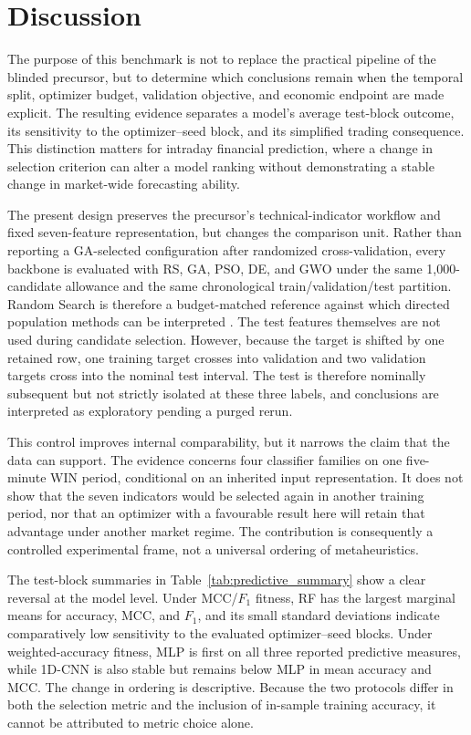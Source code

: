 \section{Discussion}\label{sec:discussion}

The purpose of this benchmark is not to replace the practical pipeline of the blinded precursor, but to determine which conclusions remain when the temporal split, optimizer budget, validation objective, and economic endpoint are made explicit. The resulting evidence separates a model's average test-block outcome, its sensitivity to the optimizer--seed block, and its simplified trading consequence. This distinction matters for intraday financial prediction, where a change in selection criterion can alter a model ranking without demonstrating a stable change in market-wide forecasting ability.

The present design preserves the precursor's technical-indicator workflow and fixed seven-feature representation, but changes the comparison unit. Rather than reporting a GA-selected configuration after randomized cross-validation, every backbone is evaluated with RS, GA, PSO, DE, and GWO under the same 1,000-candidate allowance and the same chronological train/validation/test partition. Random Search is therefore a budget-matched reference against which directed population methods can be interpreted \cite{bergstra2012random_search}. The test features themselves are not used during candidate selection. However, because the target is shifted by one retained row, one training target crosses into validation and two validation targets cross into the nominal test interval. The test is therefore nominally subsequent but not strictly isolated at these three labels, and conclusions are interpreted as exploratory pending a purged rerun.

This control improves internal comparability, but it narrows the claim that the data can support. The evidence concerns four classifier families on one five-minute WIN period, conditional on an inherited input representation. It does not show that the seven indicators would be selected again in another training period, nor that an optimizer with a favourable result here will retain that advantage under another market regime. The contribution is consequently a controlled experimental frame, not a universal ordering of metaheuristics.


The test-block summaries in Table~\ref{tab:predictive_summary} show a clear reversal at the model level. Under MCC/$F_1$ fitness, RF has the largest marginal means for accuracy, MCC, and $F_1$, and its small standard deviations indicate comparatively low sensitivity to the evaluated optimizer--seed blocks. Under weighted-accuracy fitness, MLP is first on all three reported predictive measures, while 1D-CNN is also stable but remains below MLP in mean accuracy and MCC. The change in ordering is descriptive. Because the two protocols differ in both the selection metric and the inclusion of in-sample training accuracy, it cannot be attributed to metric choice alone.


